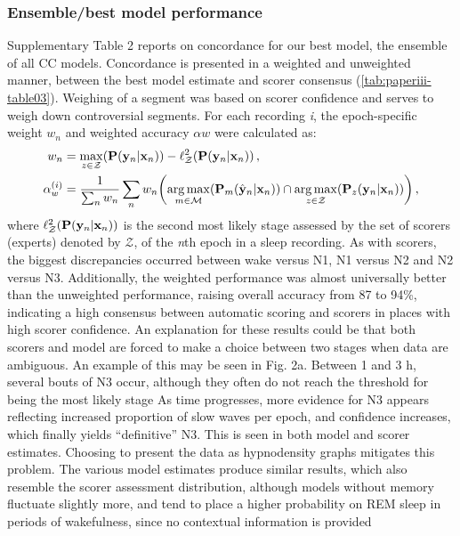 \subsubsection{Ensemble/best model performance}
Supplementary Table 2 reports on concordance for our best model, the ensemble of all CC models.
Concordance is presented in a weighted and unweighted manner, between the best model estimate and scorer consensus (\cref{tab:paperiii-table03}).
Weighing of a segment was based on scorer confidence and serves to weigh down controversial segments.
For each recording \textit{i}, the epoch-specific weight $w_n$ and weighted accuracy $\alpha w$ were calculated as:
\begin{align}
\begin{split}
    w_n &= \func{\max_{z \in \mathcal{Z}}}{\func{\mathbf{P}}{\mathbf{y}_n | \mathbf{x}_n}} - \func{\ell_{\mathcal{Z}}^2}{\func{\mathbf{P}}{\mathbf{y}_n | \mathbf{x}_n}}, \\
    \alpha_w^{(i)} &= \frac{1}{\sum_n w_n} \sum_n w_n \! \left( \func{\argmax_{m \in \mathcal{M}}}{\func{\mathbf{P}_m}{\hat{\mathbf{y}}_n | \mathbf{x}_n}} \cap \func{\argmax_{z \in \mathcal{Z}}}{\func{\mathbf{P}_z}{\mathbf{y}_n | \mathbf{x}_n}} \right),
\end{split}
\end{align}
where $\ell_{\mathcal{Z}}^2 \! \left( \mathbf{P} \! \left( \mathbf{y}_n | \mathbf{x}_n \right) \right)$ is the second most likely stage assessed by the set of scorers (experts) denoted by $\mathcal{Z}$, of the \textit{n}th epoch in a sleep recording.
As with scorers, the biggest discrepancies occurred between wake versus N1, N1 versus N2 and N2 versus N3.
Additionally, the weighted performance was almost universally better than the unweighted performance, raising overall accuracy from 87 to 94\%, indicating a high consensus between automatic scoring and scorers in places with high scorer confidence.
An explanation for these results could be that both scorers and model are forced to make a choice between two stages when data are ambiguous.
An example of this may be seen in Fig. 2a.
Between 1 and 3 h, several bouts of N3 occur, although they often do not reach the threshold for being the most likely stage
As time progresses, more evidence for N3 appears reflecting increased proportion of slow waves per epoch, and confidence increases, which finally yields “definitive” N3. 
This is seen in both model and scorer estimates.
Choosing to present the data as hypnodensity graphs mitigates this problem. 
The various model estimates produce similar results, which also resemble the scorer assessment distribution, although models without memory fluctuate slightly more, and tend to place a higher probability on REM sleep in periods of wakefulness, since no contextual information is provided

